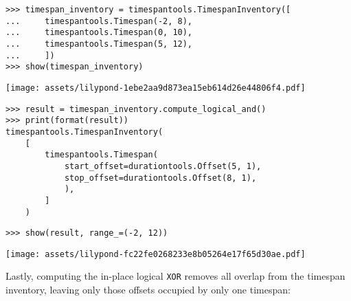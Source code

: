 \begin{abjadbookoutput}
\begin{singlespacing}
\vspace{-0.5\baselineskip}
\begin{verbatim}
>>> timespan_inventory = timespantools.TimespanInventory([
...     timespantools.Timespan(-2, 8),
...     timespantools.Timespan(0, 10),
...     timespantools.Timespan(5, 12),
...     ])
>>> show(timespan_inventory)
\end{verbatim}
\noindent\texttt{[image: assets/lilypond-1ebe2aa9d873ea15eb614d26e44806f4.pdf]}
\begin{verbatim}
>>> result = timespan_inventory.compute_logical_and()
>>> print(format(result))
timespantools.TimespanInventory(
    [
        timespantools.Timespan(
            start_offset=durationtools.Offset(5, 1),
            stop_offset=durationtools.Offset(8, 1),
            ),
        ]
    )
\end{verbatim}
\begin{verbatim}
>>> show(result, range_=(-2, 12))
\end{verbatim}
\noindent\texttt{[image: assets/lilypond-fc22fe0268233e8b05264e17f65d30ae.pdf]}
\end{singlespacing}
\end{abjadbookoutput}

\noindent Lastly, computing the in-place logical \texttt{XOR} removes all
overlap from the timespan inventory, leaving only those offsets occupied by
only one timespan:

\begin{comment}
<abjad>
timespan_inventory = timespantools.TimespanInventory([
    timespantools.Timespan(-2, 2),
    timespantools.Timespan(0, 10),
    timespantools.Timespan(5, 12),
    ])
show(timespan_inventory)
result = timespan_inventory.compute_logical_xor()
print(format(result))
show(result, range_=(-2, 12))
</abjad>
\end{comment}

